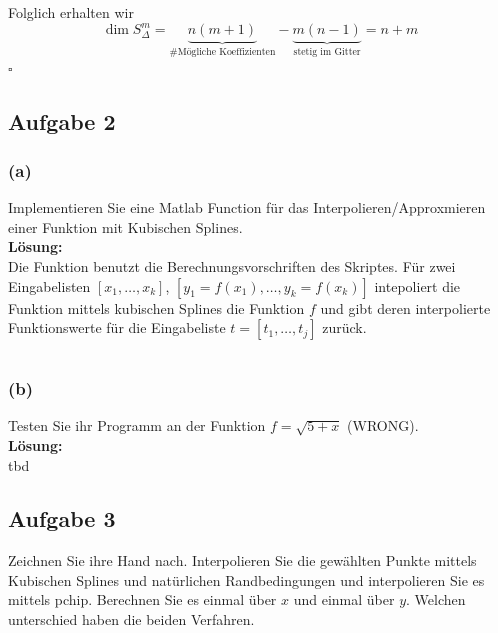 \documentclass[11pt,a4paper,ngerman]{article}
\begin{document}
Folglich erhalten wir
\begin{equation*}
    \dim S_\Delta^m = \underbrace{n(m+1)}_\text{\#Mögliche Koeffizienten} - \underbrace{m(n-1)}_\text{stetig im Gitter} = n + m
\end{equation*}
\mbox{}\hfill$\square$

\subsection*{Aufgabe 2}

\subsubsection*{(a)}

Implementieren Sie eine Matlab Function für das Interpolieren/Approxmieren einer Funktion mit Kubischen Splines.\\

\textbf{Lösung:}\\
Die Funktion benutzt die Berechnungsvorschriften des Skriptes.
Für zwei Eingabelisten $[x_1,\ldots,x_k]$, $[y_1 = f(x_1),\ldots,y_k = f(x_k)]$ 
intepoliert die Funktion mittels kubischen Splines die Funktion $f$ und gibt
deren interpolierte Funktionswerte für die Eingabeliste $t = [t_1, \ldots, t_j]$
zurück.

\begin{lstlisting}[language=matlab,numbers=left]
\end{lstlisting}

\subsubsection*{(b)}

Testen Sie ihr Programm an der Funktion $f = \sqrt{5 + x}$ (WRONG).\\

\textbf{Lösung:}\\

tbd

\subsection*{Aufgabe 3}

Zeichnen Sie ihre Hand nach. Interpolieren Sie die gewählten Punkte mittels Kubischen Splines und natürlichen Randbedingungen
und interpolieren Sie es mittels pchip. Berechnen Sie es einmal über $x$ und einmal über $y$. Welchen unterschied
haben die beiden Verfahren.\\
\end{document}
